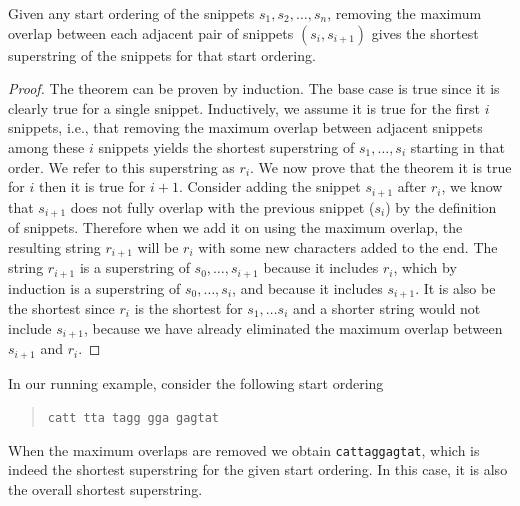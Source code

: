 \begin{flex}
\label{grp:thm:genome::shortest-superstring-by-overlap-removal}

\begin{theorem}
\label{thm:genome::shortest-superstring-by-overlap-removal}
Given any start ordering of the snippets $s_1,s_2, \ldots, s_n$,
removing the maximum overlap between each adjacent pair of snippets
$(s_i,s_{i+1})$ gives the shortest superstring of the snippets for
that start ordering.

\end{theorem}

\begin{proof}
\label{prf:genome::proven}
The theorem can be proven by induction.  
The base case is true since it is clearly true for a single snippet.
Inductively, we assume it is true for the first $i$ snippets, i.e.,
that removing the maximum overlap between adjacent snippets among
these $i$ snippets yields the shortest superstring of $s_1, \ldots,
s_i$ starting in that order.  
We refer to this superstring as $r_i$.
We now prove that the theorem it is true for $i$ then it is true for
${i+1}$.
Consider adding the snippet $s_{i+1}$ after $r_i$, we know that
$s_{i+1}$ does not fully overlap with the previous snippet ($s_{i}$)
by the definition of snippets.
Therefore when we add it on using the maximum
overlap, the resulting string $r_{i+1}$ will be $r_i$ with some new characters
added to the end.  
The string $r_{i+1}$ is a superstring of $s_0, \ldots, s_{i+1}$
because it includes $r_i$, which by induction is a superstring of
$s_0, \ldots, s_{i}$, and because it includes $s_{i+1}$.
It is also be the shortest since $r_i$ is the shortest for $s_1,
\ldots s_i$ and a shorter string would not include $s_{i+1}$, because
we have already eliminated the maximum overlap between $s_{i+1}$ and
$r_i$.

\end{proof}
\end{flex}

\begin{cluster}
\label{grp:xmpl:genome::running}

\begin{example}
\label{xmpl:genome::running}
In our running example, consider the following start ordering
\begin{quote}
  \texttt{catt}\, \texttt{tta}\, \texttt{tagg}\,
  \texttt{gga}\, \texttt{gagtat}
\end{quote}
When the maximum overlaps are removed we obtain \texttt{cattaggagtat},
which is indeed the shortest superstring for the given start ordering.
In this case, it is also the overall shortest superstring.

\end{example}
\end{cluster}

